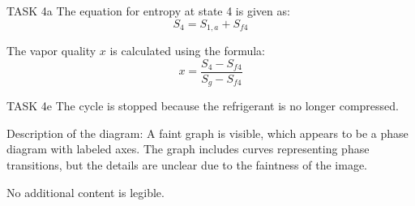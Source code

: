 TASK 4a  
The equation for entropy at state 4 is given as:  
\[
S_4 = S_{1,a} + S_{f4}
\]  

The vapor quality \( x \) is calculated using the formula:  
\[
x = \frac{S_4 - S_{f4}}{S_{g} - S_{f4}}
\]  

TASK 4e  
The cycle is stopped because the refrigerant is no longer compressed.  

Description of the diagram:  
A faint graph is visible, which appears to be a phase diagram with labeled axes. The graph includes curves representing phase transitions, but the details are unclear due to the faintness of the image.  

No additional content is legible.